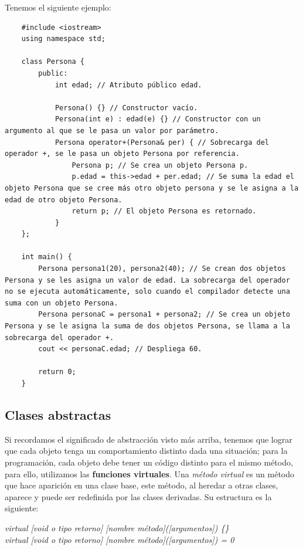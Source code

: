 Tenemos el siguiente ejemplo:
\begin{lstlisting}
    #include <iostream>
    using namespace std;
    
    class Persona {
        public:
            int edad; // Atributo público edad.

            Persona() {} // Constructor vacío.
            Persona(int e) : edad(e) {} // Constructor con un argumento al que se le pasa un valor por parámetro.
            Persona operator+(Persona& per) { // Sobrecarga del operador +, se le pasa un objeto Persona por referencia.
                Persona p; // Se crea un objeto Persona p.
                p.edad = this->edad + per.edad; // Se suma la edad el objeto Persona que se cree más otro objeto persona y se le asigna a la edad de otro objeto Persona.
                return p; // El objeto Persona es retornado.
            }
    };

    int main() {
        Persona persona1(20), persona2(40); // Se crean dos objetos Persona y se les asigna un valor de edad. La sobrecarga del operador no se ejecuta automáticamente, solo cuando el compilador detecte una suma con un objeto Persona.
        Persona personaC = persona1 + persona2; // Se crea un objeto Persona y se le asigna la suma de dos objetos Persona, se llama a la sobrecarga del operador +.
        cout << personaC.edad; // Despliega 60.
        
        return 0;
    }
\end{lstlisting}


\subsection{Clases abstractas}
\hspace{0.55cm}Si recordamos el significado de abstracción visto más arriba, tenemos que lograr que cada objeto tenga un comportamiento distinto dada una situación; para la programación, cada objeto debe tener un código distinto para el mismo método, para ello, utilizamos las \textbf{funciones virtuales}. Una \textit{método virtual} es un método que hace aparición en una clase base, este método, al heredar a otras clases, aparece y puede ser redefinida por las clases derivadas. Su estructura es la siguiente:
\begin{center}
	\textit{
		virtual [void o tipo retorno] [nombre método]([argumentos]) \{\} \\
		virtual [void o tipo retorno] [nombre método]([argumentos]) = 0
	}
\end{center}

